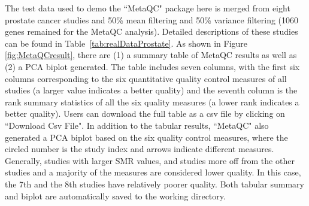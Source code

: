 The test data used to demo the ``MetaQC" package here is merged from eight prostate cancer studies and 50\% mean filtering and 50\% variance filtering (1060 genes remained for the MetaQC analysis). 
Detailed descriptions of these studies can be found in Table~\ref{tab:realDataProstate}. 
As shown in Figure \ref{fig:MetaQCresult}, there are {\color{red} (1)} a summary table of MetaQC results as well as {\color{red} (2)} a PCA biplot generated. The table includes seven columns, with the first six columns corresponding to the six quantitative quality control measures of all studies (a larger value indicates a better quality) and the seventh column is the rank summary statistics of all the six quality measures (a lower rank indicates a better quality). Users can download the full table as a csv file by clicking on ``Download Csv File". In addition to the tabular results, ``MetaQC" also generated a PCA biplot based on the six quality control measures, where the circled number is the study index and arrows indicate different measures. Generally, studies with larger SMR values, and studies more off from the other studies and a majority of the measures are considered lower quality. In this case, the 7th and the 8th studies have relatively poorer quality. Both tabular summary and biplot are automatically saved to the working directory. 


